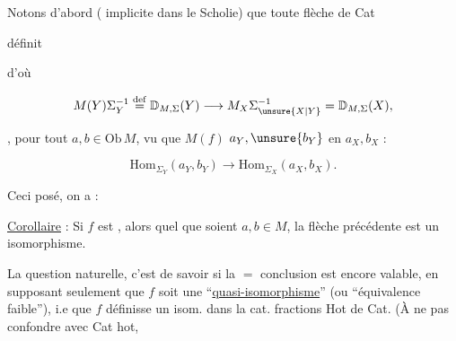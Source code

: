 

Notons d'abord  ( implicite dans le Scholie) que toute flèche de Cat


définit


d'où

\[
 M(Y)\Sigma_Y^{-1}\overset{\mathrm{def}}{=}\mathbb D_{M,\Sigma}(Y)
 \longrightarrow M_X\Sigma_{\unsure{X|Y}}^{-1}=\mathbb D_{M,\Sigma}(X),
\]

, pour tout $a,b\in\mathrm{Ob}\,M$, vu que $M(f)$   $a_Y,\unsure{b_Y}$ en $a_X,b_X$ :

\[
 \boxed{\mathrm{Hom}_{\Sigma_Y}(a_Y,b_Y)\longrightarrow\mathrm{Hom}_{\Sigma_X}(a_X,b_X)}.
\]

Ceci posé, on a :

\uline{Corollaire} : Si $f$ est   , alors quel que soient $a,b\in M$, la flèche précédente est un isomorphisme.

La question naturelle, c'est de savoir si la $=$  conclusion est encore valable, en supposant seulement que $f$ soit une ``\uline{quasi-isomorphisme}'' (ou ``équivalence faible''), i.e que $f$ définisse un isom. dans la cat.  fractions Hot de Cat. (À ne pas confondre avec Cat hot,


